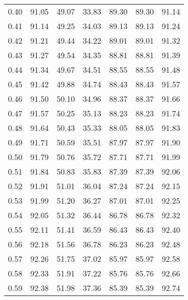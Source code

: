 \begin{tabular}{|c|c|c|c|c|c|c|}
      0.40 &     91.05 &     49.07 &      33.83 &   89.30 &      89.30 &         91.14 \\
      0.41 &     91.14 &     49.25 &      34.03 &   89.13 &      89.13 &         91.24 \\
      0.42 &     91.21 &     49.44 &      34.22 &   89.01 &      89.01 &         91.32 \\
      0.43 &     91.27 &     49.54 &      34.35 &   88.81 &      88.81 &         91.39 \\
      0.44 &     91.34 &     49.67 &      34.51 &   88.55 &      88.55 &         91.48 \\
      0.45 &     91.42 &     49.88 &      34.74 &   88.43 &      88.43 &         91.57 \\
      0.46 &     91.50 &     50.10 &      34.96 &   88.37 &      88.37 &         91.66 \\
      0.47 &     91.57 &     50.25 &      35.13 &   88.23 &      88.23 &         91.74 \\
      0.48 &     91.64 &     50.43 &      35.33 &   88.05 &      88.05 &         91.83 \\
      0.49 &     91.71 &     50.59 &      35.51 &   87.97 &      87.97 &         91.90 \\
      0.50 &     91.79 &     50.76 &      35.72 &   87.71 &      87.71 &         91.99 \\
      0.51 &     91.84 &     50.83 &      35.83 &   87.39 &      87.39 &         92.06 \\
      0.52 &     91.91 &     51.01 &      36.04 &   87.24 &      87.24 &         92.15 \\
      0.53 &     91.99 &     51.20 &      36.27 &   87.01 &      87.01 &         92.25 \\
      0.54 &     92.05 &     51.32 &      36.44 &   86.78 &      86.78 &         92.32 \\
      0.55 &     92.11 &     51.41 &      36.59 &   86.43 &      86.43 &         92.40 \\
      0.56 &     92.18 &     51.56 &      36.78 &   86.23 &      86.23 &         92.48 \\
      0.57 &     92.26 &     51.75 &      37.02 &   85.97 &      85.97 &         92.58 \\
      0.58 &     92.33 &     51.91 &      37.22 &   85.76 &      85.76 &         92.66 \\
      0.59 &     92.38 &     51.98 &      37.36 &   85.39 &      85.39 &         92.74 \\

\end{tabular}
